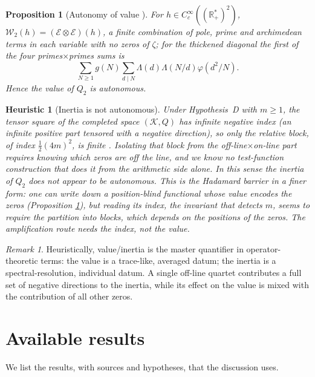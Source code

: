 \documentclass[11pt]{amsart}
\newtheorem{proposition}[theorem]{Proposition}
\newtheorem{heuristic}[theorem]{Heuristic}
\theoremstyle{definition}
\theoremstyle{remark}
\newtheorem{remark}[theorem]{Remark}
\newcommand{\bbR}{\mathbb{R}}
\newcommand{\Wtwo}{\mathcal{W}_2}
\newcommand{\La}{\Lambda}
\begin{document}
\begin{proposition}[Autonomy of value {\cite[Thms~5.3, 5.4]{P28}}]
\label{thm:autonomy}
For $h\in C_c^\infty((\bbR_+^*)^2)$, $\Wtwo(h)=(\mathcal E\otimes\mathcal
E)(h)$, a finite combination of pole, prime and archimedean terms in each
variable with no zeros of $\zeta$; for the thickened diagonal the first of
the four primes$\times$primes sums is
\[
\sum_{N\ge1} g(N)\sum_{d\mid N}\La(d)\La(N/d)\varphi(d^2/N).
\]
Hence the value of $Q_2$ is autonomous.
\end{proposition}

\begin{heuristic}[Inertia is not autonomous]\label{rem:inertia}
Under Hypothesis~D with $m\ge1$, the tensor square of the completed space
$(\mathcal K,Q)$ has infinite negative index (an infinite positive part
tensored with a negative direction), so only the relative block, of index
$\tfrac12(4m)^2$, is finite \cite[after Thm~4.2]{P28}. Isolating that block
from the off-line$\times$on-line part requires knowing which zeros are off
the line, and we know no test-function construction that does it from the
arithmetic side alone. In this sense the inertia of $Q_2$ does not appear to
be autonomous. This is the Hadamard barrier in a finer form: one can write
down a position-blind functional whose value encodes the zeros (Proposition
\ref{thm:autonomy}), but reading its index, the invariant that detects $m$,
seems to require the partition into blocks, which depends on the positions of
the zeros. The amplification route needs the index, not the value.
\end{heuristic}

\begin{remark}\label{obs:value-inertia}
Heuristically, value/inertia is the master quantifier in operator-theoretic
terms: the value is a trace-like, averaged datum; the inertia is a
spectral-resolution, individual datum. A single off-line quartet contributes
a full set of negative directions to the inertia, while its effect on the
value is mixed with the contribution of all other zeros.
\end{remark}

\section{Available results}\label{sec:ledger}

We list the results, with sources and hypotheses, that the discussion uses.
\end{document}
